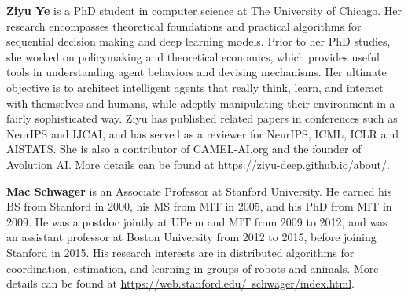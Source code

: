 \documentclass[10pt]{article} %
\begin{document}
\textbf{Ziyu Ye} is a PhD student in computer science at The University of Chicago. Her research encompasses theoretical foundations and practical algorithms for sequential decision making and deep learning models. Prior to her PhD studies, she worked on policymaking and theoretical economics, which provides useful tools in understanding agent behaviors and devising mechanisms. Her ultimate objective is to architect intelligent agents that really think, learn, and interact with themselves and humans, while adeptly manipulating their environment in a fairly sophisticated way. Ziyu has published related papers in conferences such as NeurIPS and IJCAI, and has served as a reviewer for NeurIPS, ICML, ICLR and AISTATS. She is also a contributor of CAMEL-AI.org and the founder of Avolution AI. More details can be found at \href{https://ziyu-deep.github.io/about/}{https://ziyu-deep.github.io/about/}. 


\textbf{Mac Schwager} is an Associate Professor at Stanford University. He earned his BS from Stanford in 2000, his MS from MIT in 2005, and his PhD from MIT in 2009. He was a postdoc jointly at UPenn and MIT from 2009 to 2012, and was an assistant professor at Boston University from 2012 to 2015, before joining Stanford in 2015. His research interests are in distributed algorithms for coordination, estimation, and learning in groups of robots and animals. More details can be found at \href{https://web.stanford.edu/~schwager/index.html}{https://web.stanford.edu/~schwager/index.html}. 
\end{document}
